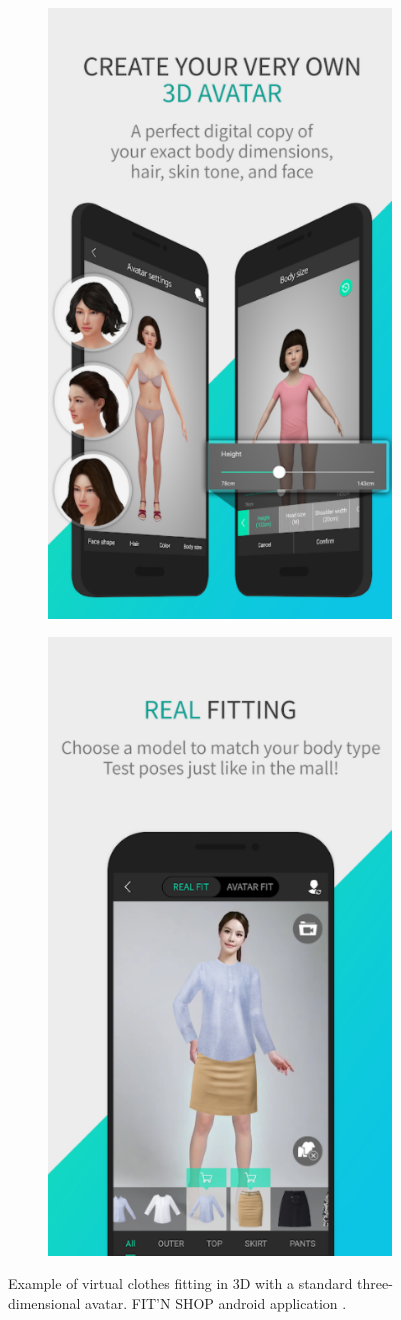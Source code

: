 \documentclass[a4paper]{report}
\begin{document}
\begin{figure}[H]
\centering
\begin{subfigure}{\textwidth}
  \centering
  \includegraphics[width=.45\textwidth , keepaspectratio]{images/VFR/VFR_example_3D_1(1).png}
  \label{fig:sub1_example_3d_1_a}
\end{subfigure}%
\begin{subfigure}{\textwidth}
  \centering
  \includegraphics[width=.45\textwidth , keepaspectratio]{images/VFR/VFR_example_3D_1(2).png}
  \label{fig:sub2_example_3d_1_b}
\end{subfigure}
\caption{Example of virtual clothes fitting in 3D with a standard three-dimensional avatar. FIT'N SHOP android application \cite{fitnshop}.}
\label{fig:example_3d_1}
\end{figure}
\end{document}
